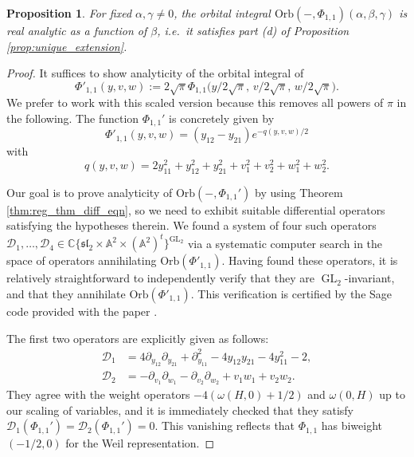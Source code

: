 \documentclass[reqno, 11pt]{amsart} %
\numberwithin{equation}{section}
\theoremstyle{plain}
\newtheorem{proposition}[theorem]{Proposition}
\theoremstyle{definition}
\theoremstyle{remark}
\newcommand{\mbA}{\mathbb{A}}
\newcommand{\mbC}{\mathbb{C}}
\newcommand{\mcD}{\mathcal{D}}
\newcommand{\mfl}{\mathfrak{l}}
\newcommand{\mfs}{\mathfrak{s}}
\newcommand{\mfsl}{\mfs\mfl}
\DeclareMathOperator{\GL}{GL}
\newcommand{\Orb}{\mathrm{Orb}}
\newcommand{\mn}{\medskip \noindent}
\begin{document}
\begin{proposition}\label{prop:analytic_GL2}
For fixed $\alpha,\gamma \neq 0$, the orbital integral $\Orb(-,Φ_{1,1})(\alpha,\beta,\gamma)$ is real analytic as a function of $\beta$, i.e.\ it satisfies part (d) of Proposition \ref{prop:unique_extension}.
\end{proposition}
\begin{proof}
\mn It suffices to show analyticity of the orbital integral of
$$Φ'_{1,1}(y, v, w) := 2\sqrt{π} Φ_{1,1}\big(y/2\sqrt{π},\, v/2\sqrt{π},\, w/2\sqrt{π}\big).$$
We prefer to work with this scaled version because this removes all powers of $π$ in the following. The function $Φ_{1,1}'$ is concretely given by
$$Φ'_{1,1}(y, v, w) = (y_{12} - y_{21})e^{-q(y, v, w)/2}$$
with
$$q(y, v, w) = 2y_{11}^2 + y_{12}^2 + y_{21}^2 + v_1^2 + v_2^2 + w_1^2 + w_2^2.$$

Our goal is to prove analyticity of $\Orb(-,Φ_{1,1}')$ by using Theorem \ref{thm:reg_thm_diff_eqn}, so we need to exhibit suitable  differential operators satisfying the hypotheses therein. We found a system of four such operators $\mcD_1,\ldots,\mcD_4 \in \mbC\{\mfsl_2\times \mbA^2\times (\mbA^2)^t\}^{\GL_2}$ via a systematic computer search in the space of operators  annihilating $\Orb(\Phi'_{1,1})$. Having found these operators, it is relatively straightforward to independently verify that they are $\GL_2$-invariant, and that they annihilate $\Orb(\Phi'_{1,1})$. This verification is certified by the Sage code provided with the paper \cite{Sage}.

The first two operators are explicitly given as follows:
\begin{equation}
\label{eq:quad_annihilating_ops}
\begin{aligned}
\mcD_1 & = 4 \partial_{y_{12}}\partial_{y_{21}} + \partial_{y_{11}}^2 - 4 y_{12}y_{21} - 4 y_{11}^2 - 2,\\[1mm]
\mcD_2 & = - \partial_{v_1}\partial_{w_1} - \partial_{v_2}\partial_{w_2} + v_1 w_1 + v_2 w_2.
\end{aligned}
\end{equation}
They agree with the weight operators $-4(ω(H,0) + 1/2)$ and $ω(0,H)$ up to our scaling of variables, and it is immediately checked that they satisfy $\mcD_1(Φ_{1,1}') = \mcD_2(Φ_{1,1}') = 0$. This vanishing reflects that $Φ_{1,1}$ has biweight $(-1/2, 0)$ for the Weil representation.


\end{proof}
\end{document}
